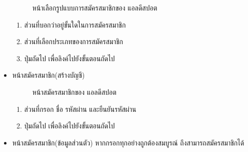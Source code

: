 \documentclass[12pt,oneside,openright,a4paper]{cpe-thai-project}
\begin{document}
\begin{itemize}
\begin{figure}[!ht]
    \caption{หน้าเลือกรูปแบบการสมัครสมาชิกของ แอลดีสปอต}\label{fig:register}
  \end{figure}
  \begin{enumerate}
    \item ส่วนที่บอกว่าอยู่ขั้นใดในการสมัครสมาชิก
    \item ส่วนที่เลือกประเภทของการสมัครสมาชิก
    \item ปุ่มถัดไป เพื่อลิงค์ไปยังขั้นตอนถัดไป
  \end{enumerate}
  \newpage
  \item หน้าสมัครสมาชิก(สร้างบัญชี)
  \begin{figure}[!ht]\centering
    \setlength{\fboxrule}{0.2mm} %
    \setlength{\fboxsep}{1cm}
    \caption{หน้าสมัครสมาชิกของ แอลดีสปอต}\label{fig:register2}
  \end{figure}
  \begin{enumerate}
    \item ส่วนที่กรอก ชื่อ รหัสผ่าน และยืนยันรหัสผ่าน
    \item ปุ่มถัดไป เพื่อลิงค์ไปยังขั้นตอนถัดไป
  \end{enumerate}
  \newpage
  \item หน้าสมัครสมาชิก(ข้อมูลส่วนตัว)
  หากกรอกทุกอย่างถูกต้องสมบูรณ์ ถึงสามารถสมัครสมาชิกได้
  \begin{figure}[!ht]\centering
    \setlength{\fboxrule}{0.2mm} %
    \setlength{\fboxsep}{1cm}

\end{figure}
\end{itemize}
\end{document}
